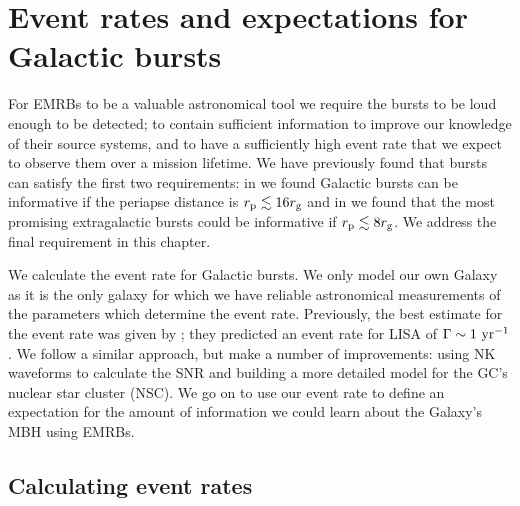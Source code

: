 \chapter{Event rates and expectations for Galactic bursts}\label{ch:events}

For EMRBs to be a valuable astronomical tool we require the bursts to be loud enough to be detected; to contain sufficient information to improve our knowledge of their source systems, and to have a sufficiently high event rate that we expect to observe them over a mission lifetime. We have previously found that bursts can satisfy the first two requirements: in  we found Galactic bursts can be informative if the periapse distance is $r_\mathrm{p} \lesssim 16 r_\mathrm{g}$ and in  we found that the most promising extragalactic bursts could be informative if $r_\mathrm{p} \lesssim 8 r_\mathrm{g}$. We address the final requirement in this chapter.

We calculate the event rate for Galactic bursts. We only model our own Galaxy as it is the only galaxy for which we have reliable astronomical measurements of the parameters which determine the event rate. Previously, the best estimate for the event rate was given by \citet{Hopman2007}; they predicted an event rate for LISA of $\Gamma \sim 1~\mathrm{yr^{-1}}$. We follow a similar approach, but make a number of improvements: using NK waveforms to calculate the SNR and building a more detailed model for the GC's nuclear star cluster (NSC). We go on to use our event rate to define an expectation for the amount of information we could learn about the Galaxy's MBH using EMRBs.

\section{Calculating event rates}\label{sec:Rates}

